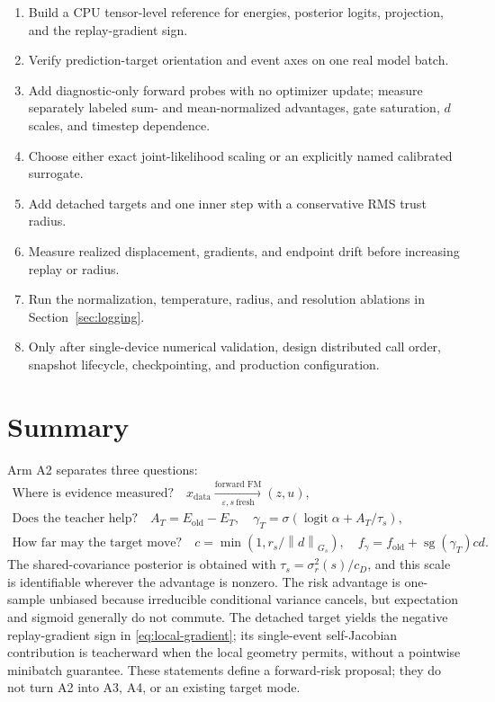 \documentclass[11pt,a4paper]{article}
\newcommand{\norm}[1]{\left\lVert #1\right\rVert}
\newcommand{\sg}{\operatorname{sg}}
\newcommand{\logit}{\operatorname{logit}}
\newcommand{\old}{\mathrm{old}}
\newcommand{\data}{\mathrm{data}}
\theoremstyle{plain}
\theoremstyle{definition}
\begin{document}
\begin{enumerate}[leftmargin=1.6em]
\item Build a CPU tensor-level reference for energies, posterior logits, projection, and the
      replay-gradient sign.
\item Verify prediction-target orientation and event axes on one real model batch.
\item Add diagnostic-only forward probes with no optimizer update; measure separately labeled
      sum- and mean-normalized advantages, gate saturation, $d$ scales, and timestep dependence.
\item Choose either exact joint-likelihood scaling or an explicitly named calibrated surrogate.
\item Add detached targets and one inner step with a conservative RMS trust radius.
\item Measure realized displacement, gradients, and endpoint drift before increasing replay or
      radius.
\item Run the normalization, temperature, radius, and resolution ablations in
      Section~\ref{sec:logging}.
\item Only after single-device numerical validation, design distributed call order, snapshot
      lifecycle, checkpointing, and production configuration.
\end{enumerate}

\section{Summary}

Arm A2 separates three questions:
\[
\boxed{
\begin{gathered}
\text{Where is evidence measured?}\quad
x_{\data}\xrightarrow[\varepsilon,s\ \mathrm{fresh}]{\text{forward FM}}(z,u),\\
\text{Does the teacher help?}\quad
A_T=E_{\old}-E_T,\quad
\gamma_T=\sigma(\logit\alpha+A_T/\tau_s),\\
\text{How far may the target move?}\quad
c=\min(1,r_s/\norm d_{G_s}),\quad
f_\gamma=f_{\old}+\sg(\gamma_T)cd.
\end{gathered}}
\]
The shared-covariance posterior is obtained with
$\tau_s=\sigma_r^2(s)/c_D$, and this scale is identifiable wherever the advantage is nonzero.
The risk advantage is one-sample unbiased because irreducible conditional variance cancels, but
expectation and sigmoid generally do not commute.  The detached target yields the negative
replay-gradient sign in \eqref{eq:local-gradient}; its single-event self-Jacobian contribution is
teacherward when the local geometry permits, without a pointwise minibatch guarantee.  These
statements define a forward-risk proposal; they do not turn A2 into A3, A4, or an existing target
mode.
\end{document}
